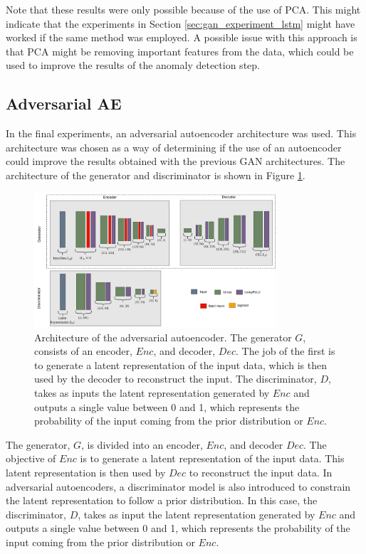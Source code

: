 Note that these results were only possible because of the use of PCA. This might indicate that the experiments in Section \ref{sec:gan_experiment_lstm} might have worked if the same method was employed. A possible issue with this approach is that PCA might be removing important features from the data, which could be used to improve the results of the anomaly detection step.

\subsection{Adversarial AE}\label{sec:aae}
In the final experiments, an adversarial autoencoder architecture was used. This architecture was chosen as a way of determining if the use of an autoencoder could improve the results obtained with the previous GAN architectures. The architecture of the generator and discriminator is shown in Figure \ref{fig:aae_architecture}. 

\begin{figure}
    \centering
    \includegraphics[width=0.8\textwidth]{figures/aae_arch.png}
    \caption[Adversarial Autoencoder Architecture]{Architecture of the adversarial autoencoder. The generator $G$, consists of an encoder, $Enc$, and decoder, $Dec$. The job of the first is to generate a latent representation of the input data, which is then used by the decoder to reconstruct the input. The discriminator, $D$, takes as inputs the latent representation generated by $Enc$ and outputs a single value between 0 and 1, which represents the probability of the input coming from the prior distribution or $Enc$.}
    \label{fig:aae_architecture}
\end{figure}

The generator, $G$, is divided into an encoder, $Enc$, and decoder $Dec$. The objective of $Enc$ is to generate a latent representation of the input data. This latent representation is then used by $Dec$ to reconstruct the input data. In adversarial autoencoders, a discriminator model is also introduced to constrain the latent representation to follow a prior distribution. In this case, the discriminator, $D$, takes as input the latent representation generated by $Enc$ and outputs a single value between 0 and 1, which represents the probability of the input coming from the prior distribution or $Enc$.

